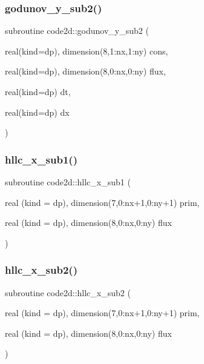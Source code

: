 \subsubsection{\texorpdfstring{godunov\+\_\+y\+\_\+sub2()}{godunov\_y\_sub2()}}
{\footnotesize\ttfamily subroutine code2d\+::godunov\+\_\+y\+\_\+sub2 (\begin{DoxyParamCaption}\item[{real(kind=dp), dimension(8,1\+:nx,1\+:ny)}]{cons,  }\item[{real(kind=dp), dimension(8,0\+:nx,0\+:ny)}]{flux,  }\item[{real(kind=dp)}]{dt,  }\item[{real(kind=dp)}]{dx }\end{DoxyParamCaption})}

\mbox{\label{main2Dv1_01_07copy_08_8f90_ad651365c868e762b033239f23065b179}} 
\subsubsection{\texorpdfstring{hllc\+\_\+x\+\_\+sub1()}{hllc\_x\_sub1()}}
{\footnotesize\ttfamily subroutine code2d\+::hllc\+\_\+x\+\_\+sub1 (\begin{DoxyParamCaption}\item[{real (kind = dp), dimension(7,0\+:nx+1,0\+:ny+1)}]{prim,  }\item[{real (kind = dp), dimension(8,0\+:nx,0\+:ny)}]{flux }\end{DoxyParamCaption})}

\mbox{\label{main2Dv1_01_07copy_08_8f90_a542b368221e3c5b6eed538ddc6538ca5}} 
\subsubsection{\texorpdfstring{hllc\+\_\+x\+\_\+sub2()}{hllc\_x\_sub2()}}
{\footnotesize\ttfamily subroutine code2d\+::hllc\+\_\+x\+\_\+sub2 (\begin{DoxyParamCaption}\item[{real (kind = dp), dimension(7,0\+:nx+1,0\+:ny+1)}]{prim,  }\item[{real (kind = dp), dimension(8,0\+:nx,0\+:ny)}]{flux }\end{DoxyParamCaption})}

